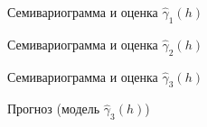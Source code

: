 \begin{figure}[H]
\caption{Семивариограмма и оценка $ \widehat{\gamma}_1(h) $}
\label{img:lin-modeled}
\end{figure}

\begin{figure}[H]
\caption{Семивариограмма и оценка $ \widehat{\gamma}_2(h) $}
\label{img:lin-fit}
\end{figure}

\begin{figure}[H]
\caption{Семивариограмма и оценка $ \widehat{\gamma}_3(h) $}
\label{img:lin-fit-cv}
\end{figure}

\begin{figure}[H]
\caption{Прогноз (модель $ \widehat{\gamma}_3(h) $)}
\label{img:lin-fit-cv-pred}
\end{figure}


